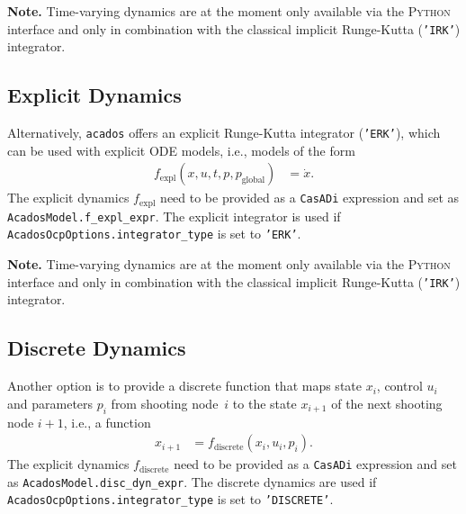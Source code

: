 \documentclass[english]{article}
\newcommand{\code}[1]{\texttt{#1}}
\newcommand{\casadi}{\texttt{CasADi}}
\newcommand{\acados}{\texttt{acados}}
\newcommand{\python}{\textsc{Python}}
\newcommand{\ind}[1]{_{\textrm{#1}}}
\newcommand{\glob}{_{\textrm{global}}}
\begin{document}
\textbf{Note.} Time-varying dynamics are at the moment only available via the \python{} interface and only in combination with the classical implicit Runge-Kutta (\code{'IRK'}) integrator.
%
\subsection{Explicit Dynamics}\label{sec:dynamics:explicit}
%
Alternatively, \acados{} offers an explicit Runge-Kutta integrator (\code{'ERK'}), which can be used with explicit ODE models, i.e., models of the form
\begin{align}
f\ind{expl}(x,u,t,p, p\glob) &= \dot{x}.\label{eq:dynamics:explicit}
\end{align}
The explicit dynamics $f\ind{expl}$ need to be provided as a \casadi{} expression and set as \code{AcadosModel.f\_expl\_expr}.
The explicit integrator is used if \code{AcadosOcpOptions.integrator\_type} is set to \code{'ERK'}.

\textbf{Note.} Time-varying dynamics are at the moment only available via the \python{} interface and only in combination with the classical implicit Runge-Kutta (\code{'IRK'}) integrator.

%
\subsection{Discrete Dynamics}\label{sec:dynamics:discrete}
%
Another option is to provide a discrete function that maps state $x_i$, control $u_i$ and parameters $p_i$ from shooting node~$i$ to the state $x_{i+1}$ of the next shooting node $i+1$, i.e., a function
\begin{align}
x_{i+1} &= f\ind{discrete}(x_i,u_i,p_i).\label{eq:dynamics:discrete}
\end{align}
The explicit dynamics $f\ind{discrete}$ need to be provided as a \casadi{} expression and set as \code{AcadosModel.disc\_dyn\_expr}.
The discrete dynamics are used if \code{AcadosOcpOptions.integrator\_type} is set to \code{'DISCRETE'}.
\end{document}
